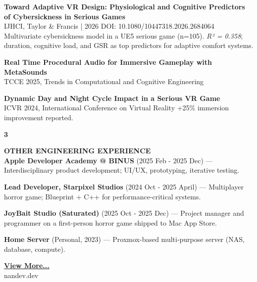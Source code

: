\documentclass[11pt,a4paper]{article}
\begin{document}
\begin{minipage}[t]{18cm}
\begin{minipage}[t]{17cm}
\textbf{Toward Adaptive VR Design: Physiological and Cognitive Predictors of Cybersickness in Serious Games}\\
{\small IJHCI, Taylor \& Francis | 2026 \textbar{} DOI: 10.1080/10447318.2026.2684064\\
Multivariate cybersickness model in a UE5 serious game (n=105). \emph{R² = 0.358}; duration, cognitive load, and GSR as top predictors for adaptive comfort systems.}

\vspace{0.2cm}

\textbf{Real Time Procedural Audio for Immersive Gameplay with MetaSounds}\\
{\small TCCE 2025, Trends in Computational and Cognitive Engineering}

\vspace{0.2cm}

\textbf{Dynamic Day and Night Cycle Impact in a Serious VR Game}\\
{\small ICVR 2024, International Conference on Virtual Reality \textbar{} +25\% immersion improvement reported.}

\end{minipage}

\vspace{0.5cm}

\begin{minipage}[t]{0.8cm}
{\Large\bfseries 3}
\end{minipage}%
\begin{minipage}[t]{17cm}
{\large\bfseries OTHER ENGINEERING EXPERIENCE}\\[8pt]

\textbf{Apple Developer Academy @ BINUS} (2025 Feb - 2025 Dec) — Interdisciplinary product development; UI/UX, prototyping, iterative testing.

\vspace{0.2cm}

\textbf{Lead Developer, Starpixel Studios} (2024 Oct - 2025 April) — Multiplayer horror game; Blueprint + C++ for performance-critical systems.

\vspace{0.2cm}

\textbf{JoyBait Studio (Saturated)} (2025 Oct - 2025 Dec) — Project manager and programmer on a first-person horror game shipped to Mac App Store.

\vspace{0.2cm}

\textbf{Home Server} (Personal, 2023) — Proxmox-based multi-purpose server (NAS, database, compute).

\end{minipage}

\vspace{0.8cm}

\begin{center}
\href{https://nandev.dev}{\bfseries\color{accent}\underline{View More...}}\\[4pt]
{\small nandev.dev}
\end{center}

\end{minipage}
\end{document}
